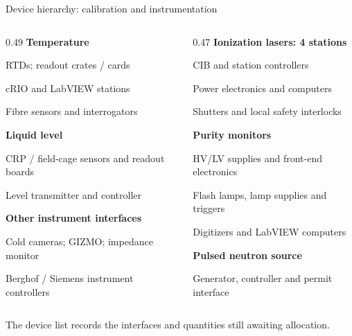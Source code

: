 \begin{frame}{Device hierarchy: calibration and instrumentation}
\small
\begin{columns}[T,onlytextwidth]
\begin{column}{0.49\textwidth}
\textbf{Temperature}\par
\hspace*{0.8em}RTDs; readout crates / cards\par
\hspace*{0.8em}cRIO and LabVIEW stations\par
\hspace*{0.8em}Fibre sensors and interrogators\par\medskip
\textbf{Liquid level}\par
\hspace*{0.8em}CRP / field-cage sensors and readout boards\par
\hspace*{0.8em}Level transmitter and controller\par\medskip
\textbf{Other instrument interfaces}\par
\hspace*{0.8em}Cold cameras; GIZMO; impedance monitor\par
\hspace*{0.8em}Berghof / Siemens instrument controllers
\end{column}
\begin{column}{0.47\textwidth}
\textbf{Ionization lasers: 4 stations}\par
\hspace*{0.8em}CIB and station controllers\par
\hspace*{0.8em}Power electronics and computers\par
\hspace*{0.8em}Shutters and local safety interlocks\par\medskip
\textbf{Purity monitors}\par
\hspace*{0.8em}HV/LV supplies and front-end electronics\par
\hspace*{0.8em}Flash lamps, lamp supplies and triggers\par
\hspace*{0.8em}Digitizers and LabVIEW computers\par\medskip
\textbf{Pulsed neutron source}\par
\hspace*{0.8em}Generator, controller and permit interface
\end{column}
\end{columns}\par\bigskip
The device list records the interfaces and quantities still awaiting allocation.
\end{frame}
